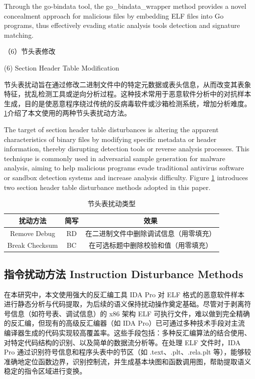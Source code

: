 Through the go-bindata tool, the go\_bindata\_wrapper method provides a novel concealment approach for malicious files by embedding ELF files into Go programs, thus effectively evading static analysis tools detection and signature matching.

（6）节头表修改

(6) Section Header Table Modification

节头表扰动旨在通过修改二进制文件中的特定元数据或表头信息，从而改变其表象特征，扰乱检测工具或逆向分析过程。这种技术常用于恶意软件分析中的对抗样本生成，目的是使恶意程序绕过传统的反病毒软件或沙箱检测系统，增加分析难度。\ref{tab:4.5}介绍了本文使用的两种节头表扰动方法。

The target of section header table disturbances is altering the apparent characteristics of binary files by modifying specific metadata or header information, thereby disrupting detection tools or reverse analysis processes. This technique is commonly used in adversarial sample generation for malware analysis, aiming to help malicious programs evade traditional antivirus software or sandbox detection systems and increase analysis difficulty. Figure \ref{tab:4.5} introduces two section header table disturbance methods adopted in this paper.

\begin{table}[htbp]
	\centering
	\caption{节头表扰动类型}\label{tab:4.5}
	\begin{tabular*}{0.9\textwidth}{@{\extracolsep{\fill}}ccc}
		\toprule
		扰动方法 & 简写 & 效果 \\
		\midrule
		Remove Debug & RD & 在二进制文件中删除调试信息（用零填充） \\
		Break Checksum & BC & 在可选标题中删除校验和值（用零填充） \\
		\bottomrule
	\end{tabular*}
\end{table}



\subsection{指令扰动方法 Instruction Disturbance Methods}

在本研究中，本文使用强大的反汇编工具 IDA Pro 对 ELF 格式的恶意软件样本进行静态分析与代码提取，为后续的语义保持扰动操作奠定基础。尽管对于剥离符号信息（如符号表、调试信息）的 x86 架构 ELF 可执行文件，难以做到完全精确的反汇编，但现有的高级反汇编器（如 IDA Pro）已可通过多种技术手段对主流编译器生成的代码实现较高覆盖率。这些手段包括：多种反汇编算法的结合使用、对特定代码结构的识别、以及简单的数据流分析等。在处理 ELF 文件时，IDA Pro 通过识别符号信息和程序头表中的节区（如 .text、.plt、.rela.plt 等），能够较准确地定位函数边界，识别控制流，并生成基本块图和函数调用图，帮助提取语义稳定的指令区域进行变换。

